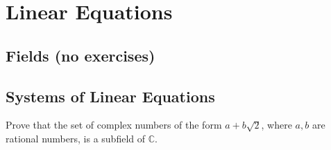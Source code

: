 \chapter{Linear Equations}

\section{Fields (no exercises)}

\section{Systems of Linear Equations}

\begin{exercise}
    Prove that the set of complex numbers of the form $a + b\sqrt{2}$, where $a, b$ are rational numbers, is a subfield of $\mathbb{C}$.
\end{exercise}

